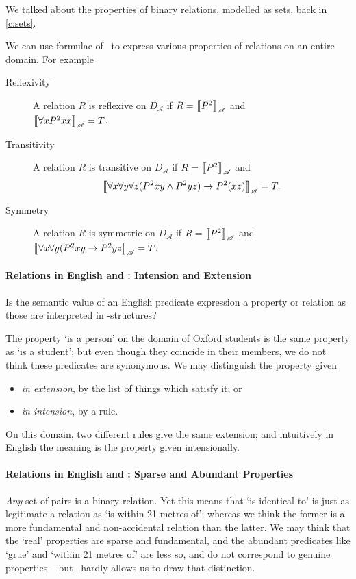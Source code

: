 We talked about the properties of binary relations, modelled as sets, back in \autoref{c:sets}.

 We can use formulae of \ltwo\ to express various properties of relations on an entire domain. For example \begin{description}
 	\item [Reflexivity] A relation $R$ is reflexive on $D_{\mathscr{A}}$ if $R = \left\llbracket P^{2}\right\rrbracket_{\mathscr{A}}$ and\\ $\left\llbracket \forall x P^{2}xx\right\rrbracket_{\mathscr{A}}=T$. 
\item [Transitivity] A relation $R$ is transitive on $D_{\mathscr{A}}$ if $R = \left\llbracket P^{2}\right\rrbracket_{\mathscr{A}}$ and $$\left\llbracket \forall x \forall y \forall z (P^{2}xy \wedge P^{2}yz) \to P^{2}(xz)\right\rrbracket_{\mathscr{A}}=T.$$ 
\item [Symmetry] A relation $R$ is symmetric on $D_{\mathscr{A}}$ if $R = \left\llbracket P^{2}\right\rrbracket_{\mathscr{A}}$ and\\ $\left\llbracket \forall x \forall y  (P^{2}xy \to P^{2}yz\right\rrbracket_{\mathscr{A}}=T$. 
 \end{description}

\paragraph{Relations in English and \ltwo: Intension and Extension}

Is the semantic value of an English predicate expression a property or relation as those are interpreted in \ltwo-structures?

The property `is a person' on the domain of Oxford students is the same property as `is a student'; but even though they coincide in their members, we do not think these predicates are synonymous. We may distinguish the property given \begin{itemize}\item \emph{in extension}, by the list of things which satisfy it; or \item \emph{in intension}, by a rule.\end{itemize} On this domain, two different rules give the same extension; and intuitively in English the meaning is the property given intensionally.

\paragraph{Relations in English and \ltwo: Sparse and Abundant Properties}


 \emph{Any} set of pairs is a binary relation. Yet this means that `is identical to' is just as legitimate a relation as `is within 21 metres of'; whereas we think the former is a more fundamental and non-accidental relation than the latter. We may think that the `real' properties are sparse and fundamental, and the abundant predicates like `grue' and `within 21 metres of' are less so, and do not correspond to genuine properties – but \ltwo\ hardly allows us to draw that distinction.


